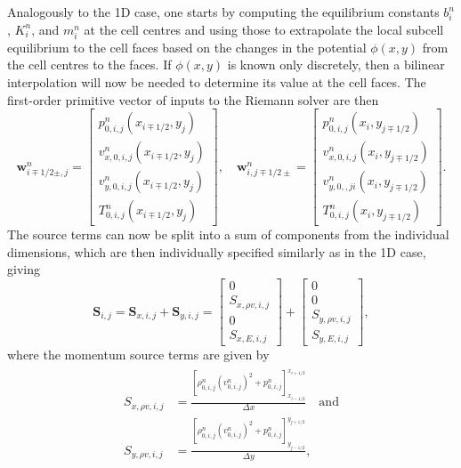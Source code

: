 Analogously to the 1D case, one starts by computing the equilibrium constants $b_i^n$, $K_i^n$, and $m_i^n$ at the cell centres and using those to extrapolate the local subcell equilibrium to the cell faces based on the changes in the potential $\phi(x,y)$ from the cell centres to the faces. If $\phi(x,y)$ is known only discretely, then a bilinear interpolation will now be needed to determine its value at the cell faces. The first-order primitive vector of inputs to the Riemann solver are then
\begin{equation} \label{eq:primitives2D1}
\mathbf{w}_{i\mp1/2\pm,j}^n=
\begin{bmatrix}
p_{0,i,j}^n(x_{i\mp1/2},y_j) \\ v_{x,0,i,j}^n(x_{i\mp1/2},y_j) \\ v_{y,0,i,j}^n(x_{i\mp1/2},y_j) \\ T_{0,i,j}^n(x_{i\mp1/2},y_j)
\end{bmatrix}
, \quad \mathbf{w}_{i,j\mp1/2\pm}^n=
\begin{bmatrix}
p_{0,i,j}^n(x_i,y_{j\mp1/2}) \\ v_{x,0,i,j}^n(x_i,y_{j\mp1/2}) \\ v_{y,0,,ji}^n(x_i,y_{j\mp1/2}) \\ T_{0,i,j}^n(x_i,y_{j\mp1/2})
\end{bmatrix}.
\end{equation}
The source terms can now be split into a sum of components from the individual dimensions, which are then individually specified similarly as in the 1D case, giving
\begin{equation}
\mathbf{S}_{i,j}=\mathbf{S}_{x,i,j}+\mathbf{S}_{y,i,j}=
\begin{bmatrix}
0 \\ S_{x,\rho v,i,j} \\ 0 \\ S_{x,E,i,j}
\end{bmatrix} +
\begin{bmatrix}
0 \\ 0 \\ S_{y,\rho v,i,j} \\ S_{y,E,i,j}
\end{bmatrix},
\end{equation}
where the momentum source terms are given by
\begin{align}
\begin{split}
S_{x,\rho v,i,j}&=\frac{\left[\rho_{0,i,j}^n(v_{0,i,j}^n)^2+p_{0,i,j}^n\right]_{x_{i-1/2}}^{x_{i+1/2}}}{\Delta x} \quad \textrm{and} \\
S_{y,\rho v,i,j}&=\frac{\left[\rho_{0,i,j}^n(v_{0,i,j}^n)^2+p_{0,i,j}^n\right]_{y_{j-1/2}}^{y_{j+1/2}}}{\Delta y},
\end{split}
\end{align}
